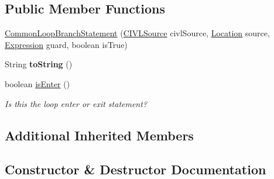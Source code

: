 \subsection*{Public Member Functions}
\begin{DoxyCompactItemize}
\item 
\hyperlink{classedu_1_1udel_1_1cis_1_1vsl_1_1civl_1_1model_1_1common_1_1statement_1_1CommonLoopBranchStatement_a394f2b26bb1da76f4cb9de6ead26ac8a}{Common\+Loop\+Branch\+Statement} (\hyperlink{interfaceedu_1_1udel_1_1cis_1_1vsl_1_1civl_1_1model_1_1IF_1_1CIVLSource}{C\+I\+V\+L\+Source} civl\+Source, \hyperlink{interfaceedu_1_1udel_1_1cis_1_1vsl_1_1civl_1_1model_1_1IF_1_1location_1_1Location}{Location} source, \hyperlink{interfaceedu_1_1udel_1_1cis_1_1vsl_1_1civl_1_1model_1_1IF_1_1expression_1_1Expression}{Expression} guard, boolean is\+True)
\item 
\hypertarget{classedu_1_1udel_1_1cis_1_1vsl_1_1civl_1_1model_1_1common_1_1statement_1_1CommonLoopBranchStatement_a5a4d143539f6a97d226a1ca4cf12a57f}{}String {\bfseries to\+String} ()\label{classedu_1_1udel_1_1cis_1_1vsl_1_1civl_1_1model_1_1common_1_1statement_1_1CommonLoopBranchStatement_a5a4d143539f6a97d226a1ca4cf12a57f}

\item 
boolean \hyperlink{classedu_1_1udel_1_1cis_1_1vsl_1_1civl_1_1model_1_1common_1_1statement_1_1CommonLoopBranchStatement_a6f4db9f7425a1970112396cab33858f6}{is\+Enter} ()
\begin{DoxyCompactList}\small\item\em Is this the loop enter or exit statement? \end{DoxyCompactList}\end{DoxyCompactItemize}
\subsection*{Additional Inherited Members}


\subsection{Constructor \& Destructor Documentation}
\hypertarget{classedu_1_1udel_1_1cis_1_1vsl_1_1civl_1_1model_1_1common_1_1statement_1_1CommonLoopBranchStatement_a394f2b26bb1da76f4cb9de6ead26ac8a}{}
